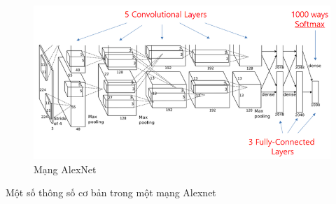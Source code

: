 \begin{center}
    \begin{figure}[h!]
    \begin{center}
     \includegraphics[scale=0.5]{img/alexnet2.png}
    \end{center}
    \caption{Mạng AlexNet \cite{lenet5}}
    \label{refhinh13}
    \end{figure}
\end{center}

Một số thông số cơ bản trong một mạng Alexnet \cite{alexnet}

